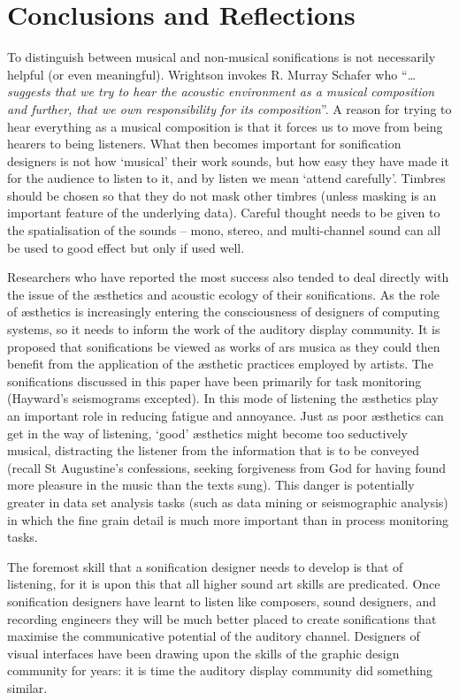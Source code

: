 \documentclass{article}
\begin{document}
\section{Conclusions and Reflections}
To distinguish between musical and non-musical sonifications is not necessarily helpful (or even meaningful). Wrightson \cite{Wrightson:2000} invokes R. Murray Schafer \cite{Schafer:1977} who ``\textit{\ldots suggests that we try to hear the acoustic environment as a musical composition and further, that we own responsibility for its composition}''. A reason for trying to hear everything as a musical composition is that it forces us to move from being hearers to being listeners. What then becomes important for sonification designers is not how `musical' their work sounds, but how easy they have made it for the audience to listen to it, and by listen we mean `attend carefully'. Timbres should be chosen so that they do not mask other timbres (unless masking is an important feature of the underlying data). Careful thought needs to be given to the spatialisation of the sounds -- mono, stereo, and multi-channel sound can all be used to good effect but only if used well.

Researchers who have reported the most success also tended to deal directly with the issue of the æsthetics and acoustic ecology of their sonifications. As the role of æsthetics is increasingly entering the consciousness of designers of computing systems, so it needs to inform the work of the auditory display community. It is proposed that sonifications be viewed as works of ars musica as they could then benefit from the application of the æsthetic practices employed by artists. The sonifications discussed in this paper have been primarily for task monitoring (Hayward's seismograms excepted). In this mode of listening the æsthetics play an important role in reducing fatigue and annoyance. Just as poor æsthetics can get in the way of listening, `good' æsthetics might become too seductively musical, distracting the listener from the information that is to be conveyed (recall St Augustine's confessions, seeking forgiveness from God for having found more pleasure in the music than the texts sung). This danger is potentially greater in data set analysis tasks (such as data mining or seismographic analysis) in which the fine grain detail is much more important than in process monitoring tasks.

The foremost skill that a sonification designer needs to develop is that of listening, for it is upon this that all higher sound art skills are predicated. Once sonification designers have learnt to listen like composers, sound designers, and recording engineers they will be much better placed to create sonifications that maximise the communicative potential of the auditory channel. Designers of visual interfaces have been drawing upon the skills of the graphic design community for years: it is time the auditory display community did something similar.
\end{document}
